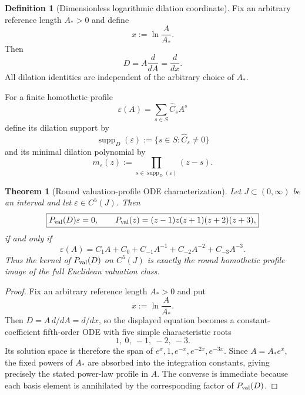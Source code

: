 \documentclass[11pt,a4paper]{article}
\def\dd{d}%
\def\Dil{D}%
\numberwithin{equation}{section}
\theoremstyle{definition}
\newtheorem{definition}[criterion]{Definition}
\theoremstyle{plain}
\newtheorem{theorem}[criterion]{Theorem}
\theoremstyle{remark}
\newcommand{\Dil}{\mathscr{D}}
\newcommand{\dd}{\mathrm{d}}
\begin{document}
\begin{definition}[Dimensionless logarithmic dilation coordinate]
Fix an arbitrary reference length \(A_*>0\) and define
\begin{equation}
x:=\ln\frac{A}{A_*}.
\end{equation}
Then
\begin{equation}
\Dil=A\frac{\dd}{\dd A}=\frac{\dd}{\dd x}.
\end{equation}
All dilation identities are independent of the arbitrary choice of \(A_*\).
\end{definition}
For a finite homothetic profile
\begin{equation}
\varepsilon(A)=\sum_{s\in S}\widehat C_s A^s
\end{equation}
define its dilation support by
\begin{equation}
\operatorname{supp}_{\Dil}(\varepsilon)
:=\{s\in S:\widehat C_s\neq0\}
\end{equation}
and its minimal dilation polynomial by
\begin{equation}
m_{\varepsilon}(z)
:=\prod_{s\in\operatorname{supp}_{\Dil}(\varepsilon)}(z-s).
\end{equation}

\begin{theorem}[Round valuation-profile ODE characterization]
Let \(J\subset(0,\infty)\) be an interval and let \(\varepsilon\in C^5(J)\). Then
\begin{equation}
\boxed{
P_{\rm val}(\Dil)\varepsilon=0,
\qquad
P_{\rm val}(z)=(z-1)z(z+1)(z+2)(z+3),
}
\end{equation}
if and only if
\begin{equation}
\boxed{
\varepsilon(A)
=C_1A+C_0+C_{-1}A^{-1}+C_{-2}A^{-2}+C_{-3}A^{-3}.
}
\end{equation}
Thus the kernel of \(P_{\rm val}(\Dil)\) on \(C^5(J)\) is exactly the round homothetic profile image of the full Euclidean valuation class.
\end{theorem}
\begin{proof}
Fix an arbitrary reference length \(A_*>0\) and put
\begin{equation}
x:=\ln\frac{A}{A_*}.
\end{equation}
Then \(\Dil=A\,\dd/\dd A=\dd/\dd x\), so the displayed equation becomes a constant-coefficient fifth-order ODE with five simple characteristic roots
\begin{equation}
1,\ 0,\ -1,\ -2,\ -3.
\end{equation}
Its solution space is therefore the span of \(e^x,1,e^{-x},e^{-2x},e^{-3x}\). Since \(A=A_*e^x\), the fixed powers of \(A_*\) are absorbed into the integration constants, giving precisely the stated power-law profile in \(A\). The converse is immediate because each basis element is annihilated by the corresponding factor of \(P_{\rm val}(\Dil)\).
\end{proof}
\end{document}
